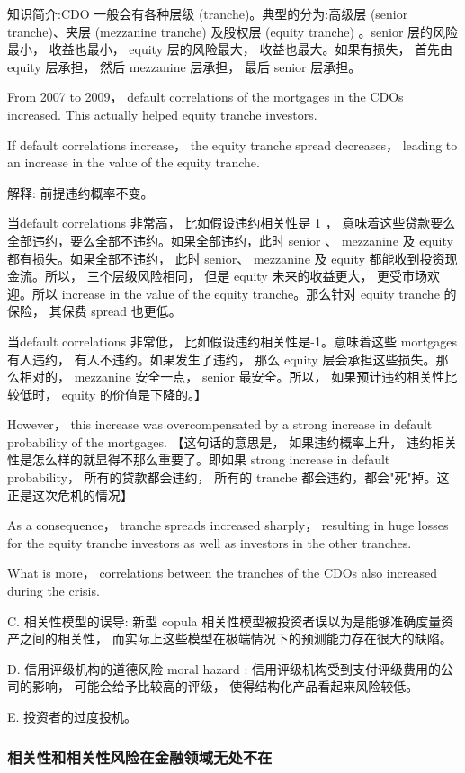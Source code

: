 知识简介:CDO 一般会有各种层级 (tranche)。典型的分为:高级层 (senior tranche)、夹层 (mezzanine tranche) 及股权层 (equity tranche) 。senior 层的风险最小， 收益也最小， equity 层的风险最大， 收益也最大。如果有损失， 首先由 equity 层承担， 然后 mezzanine 层承担， 最后 senior 层承担。

From 2007 to 2009， default correlations of the mortgages in the CDOs increased. This actually helped equity tranche investors.

 If default correlations increase， the equity tranche spread decreases， leading to an increase in the value of the equity tranche.

 解释: 前提违约概率不变。

 当default correlations 非常高， 比如假设违约相关性是 1 ， 意味着这些贷款要么全部违约，要么全部不违约。如果全部违约，此时 senior 、 mezzanine 及 equity 都有损失。如果全部不违约， 此时 senior、 mezzanine 及 equity 都能收到投资现金流。所以， 三个层级风险相同， 但是 equity 未来的收益更大， 更受市场欢迎。所以 increase in the value of the equity tranche。那么针对 equity tranche 的保险， 其保费 spread 也更低。

 当default correlations 非常低， 比如假设违约相关性是-1。意味着这些 mortgages 有人违约， 有人不违约。如果发生了违约， 那么 equity 层会承担这些损失。那么相对的， mezzanine 安全一点， senior 最安全。所以， 如果预计违约相关性比较低时， equity 的价值是下降的。】

However， this increase was overcompensated by a strong increase in default probability of the mortgages. 【这句话的意思是， 如果违约概率上升， 违约相关性是怎么样的就显得不那么重要了。即如果 strong increase in default probability， 所有的贷款都会违约， 所有的 tranche 都会违约，都会"死"掉。这正是这次危机的情况】

As a consequence， tranche spreads increased sharply， resulting in huge losses for the equity tranche investors as well as investors in the other tranches.

What is more， correlations between the tranches of the CDOs also increased during the crisis.

C. 相关性模型的误导: 新型 copula 相关性模型被投资者误以为是能够准确度量资产之间的相关性， 而实际上这些模型在极端情况下的预测能力存在很大的缺陷。

D. 信用评级机构的道德风险 moral hazard : 信用评级机构受到支付评级费用的公司的影响， 可能会给予比较高的评级， 使得结构化产品看起来风险较低。

E. 投资者的过度投机。

\subsubsection{相关性和相关性风险在金融领域无处不在 }



